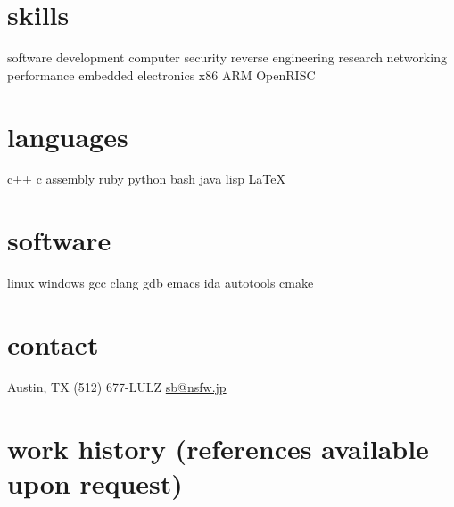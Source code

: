 \documentclass[]{friggeri-cv}
\begin{document}
\newpage
\begin{aside}
  \section{skills}
  software development
  computer security
  reverse engineering
  research
  networking
  performance
  embedded
  electronics
  x86
  ARM
  OpenRISC
  \section{languages}
  c++
  c
  assembly
  ruby
  python
  bash
  java
  lisp
  \LaTeX
  \section{software}
  linux
  windows
  gcc
  clang
  gdb
  emacs
  ida
  autotools
  cmake
  \section{contact}
  Austin, TX
  (512) 677-LULZ
  \href{mailto:sb@nsfw.jp}{sb@nsfw.jp}
\end{aside}

\section{work history \hfill {\footnotesize{}(references available upon request)}}
\end{document}
